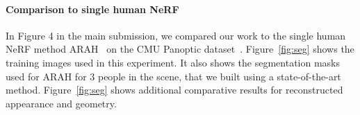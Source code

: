 \begin{table}[h!]
\begin{center}
\caption{Geometry reconstruction error under varying number of people, compared to NeuS~\cite{wang2021neus} and VolSDF~\cite{yariv2021volume} using the synthetic dataset, with 5/10/15 views for training. Symbol `$-$' represents cases where the baselines fail to reconstruct a meaningful geometry.}
\label{tab:chamfer}
\end{center}
\end{table}


\paragraph{Comparison to single human NeRF}
In Figure 4 in the main submission, we compared our work to the single human NeRF method ARAH~\cite{wang2022arah} on the CMU Panoptic dataset~\cite{Simon_2017_CVPR,Joo_2017_TPAMI}. Figure~\ref{fig:seg} shows the training images used in this experiment. It also shows the segmentation masks used for ARAH for 3 people in the scene, that we built using a state-of-the-art method. Figure~\ref{fig:seg} shows additional comparative results for reconstructed appearance and geometry. 

